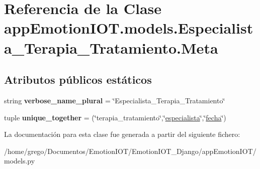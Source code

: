 \hypertarget{classappEmotionIOT_1_1models_1_1Especialista__Terapia__Tratamiento_1_1Meta}{}\section{Referencia de la Clase app\+Emotion\+I\+O\+T.\+models.\+Especialista\+\_\+\+Terapia\+\_\+\+Tratamiento.\+Meta}
\label{classappEmotionIOT_1_1models_1_1Especialista__Terapia__Tratamiento_1_1Meta}
\subsection*{Atributos públicos estáticos}
\begin{DoxyCompactItemize}
\item 
string {\bfseries verbose\+\_\+name\+\_\+plural} = \char`\"{}Especialista\+\_\+\+Terapia\+\_\+\+Tratamiento\char`\"{}\hypertarget{classappEmotionIOT_1_1models_1_1Especialista__Terapia__Tratamiento_1_1Meta_a590aaea636350d44f54052f02606a698}{}\label{classappEmotionIOT_1_1models_1_1Especialista__Terapia__Tratamiento_1_1Meta_a590aaea636350d44f54052f02606a698}

\item 
tuple {\bfseries unique\+\_\+together} = (\char`\"{}terapia\+\_\+tratamiento\char`\"{},\char`\"{}\hyperlink{classappEmotionIOT_1_1models_1_1Especialista__Terapia__Tratamiento_ae2de30c50c974691c85486733dfda31a}{especialista}\char`\"{},\char`\"{}\hyperlink{classappEmotionIOT_1_1models_1_1Especialista__Terapia__Tratamiento_a6af60a992bc306363111d046e984e95c}{fecha}\char`\"{})\hypertarget{classappEmotionIOT_1_1models_1_1Especialista__Terapia__Tratamiento_1_1Meta_ab8b5d1feccfe8cc521e97db10f79ca54}{}\label{classappEmotionIOT_1_1models_1_1Especialista__Terapia__Tratamiento_1_1Meta_ab8b5d1feccfe8cc521e97db10f79ca54}

\end{DoxyCompactItemize}


La documentación para esta clase fue generada a partir del siguiente fichero\+:\begin{DoxyCompactItemize}
\item 
/home/grego/\+Documentos/\+Emotion\+I\+O\+T/\+Emotion\+I\+O\+T\+\_\+\+Django/app\+Emotion\+I\+O\+T/models.\+py\end{DoxyCompactItemize}
